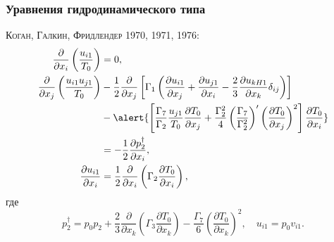 \documentclass[mathserif]{beamer} %
\newcommand{\pder}[2][]{\frac{\partial#1}{\partial#2}}
\newcommand{\Cite}[2][]{\alert{\textsc{#2 #1}}}
\begin{document}
\begin{frame}
    \frametitle{Уравнения гидродинамического типа}
    \Cite[1970, 1971, 1976]{Коган, Галкин, Фридлендер}:
    \begin{align*}
        \pder{x_i}\left(\frac{u_{i1}}{T_0}\right) &= 0, \\
        \pder{x_j}\left(\frac{u_{i1}u_{j1}}{T_0}\right)
            &-\frac12\pder{x_j}\left[\Gamma_1\left(
                \pder[u_{i1}]{x_j} + \pder[u_{j1}]{x_i} - \frac23\pder[u_{kH1}]{x_k}\delta_{ij}
            \right)\right] \notag\\
            &-\alert{\left[
                \frac{\Gamma_7}{\Gamma_2}\frac{u_{j1}}{T_0}\pder[T_0]{x_j}
                + \frac{\Gamma_2^2}4 \left(\frac{\Gamma_7}{\Gamma_2^2}\right)'
                    \left(\pder[T_0]{x_j}\right)^2
            \right]\pder[T_0]{x_i}} \notag\\
            &= -\frac12\pder[p_2^\dag]{x_i}, \\
        \pder[u_{i1}]{x_i} &= \frac12\pder{x_i}\left(\Gamma_2\pder[T_0]{x_i}\right),
    \end{align*}
    где
    \begin{equation*}
        p_2^\dag = p_0 p_2
            + \frac23\pder{x_k}\left(\Gamma_3\pder[T_0]{x_k}\right)
            - \frac{\Gamma_7}{6}\left(\pder[T_0]{x_k}\right)^2, \quad u_{i1} = p_0v_{i1}.
    \end{equation*}
\end{frame}
\end{document}
